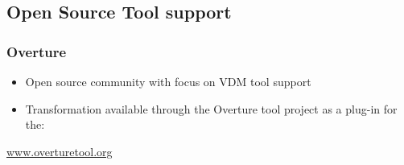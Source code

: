 \subsection{Open Source Tool support}
%
%
\frame
{
  \frametitle{Overture}

  \begin{itemize}
  		\item<1-> Open source community with focus on VDM tool support
  		\item<2-> Transformation available through the Overture tool project as a plug-in for the:
  \end{itemize}

\pause
 \begin{center} 
	\vspace{1cm}
  \LARGE {}

\vspace{2cm}
	\href{www.overturetool.org}{www.overturetool.org}
  

\end{center}
}

